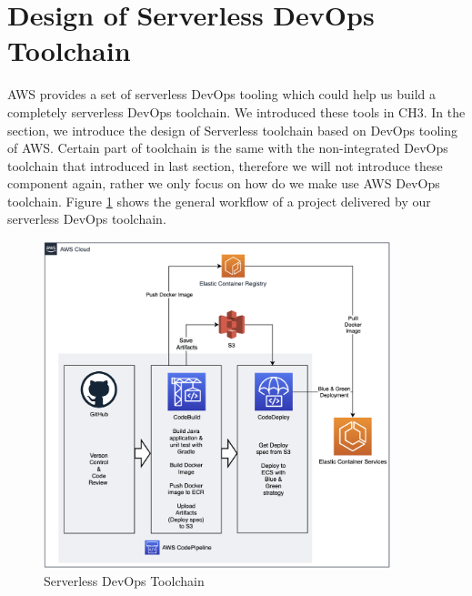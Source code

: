 \section{Design of Serverless DevOps Toolchain}
AWS provides a set of serverless DevOps tooling which could help us build a completely serverless DevOps toolchain. We introduced these tools in CH3. In the section, we introduce the design of Serverless toolchain based on DevOps tooling of AWS. Certain part of toolchain is the same with the non-integrated DevOps toolchain that introduced in last section, therefore we will not introduce these component again, rather we only focus on how do we make use AWS DevOps toolchain. Figure \ref{fig:codepipeline} shows the general workflow of a project delivered by our serverless DevOps toolchain.
\begin{figure}[h]
    \centering
    \includegraphics[width=0.90\textwidth]{pics/codepipeline.png}
    \caption{Serverless DevOps Toolchain}
    \label{fig:codepipeline}
\end{figure}
